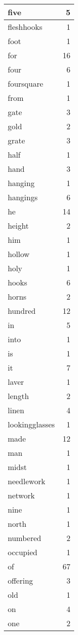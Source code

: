 \begin{center}
\begin{longtable}{l|r}
five & 5 \\ \hline
fleshhooks & 1 \\ \hline
foot & 1 \\ \hline
for & 16 \\ \hline
four & 6 \\ \hline
foursquare & 1 \\ \hline
from & 1 \\ \hline
gate & 3 \\ \hline
gold & 2 \\ \hline
grate & 3 \\ \hline
half & 1 \\ \hline
hand & 3 \\ \hline
hanging & 1 \\ \hline
hangings & 6 \\ \hline
he & 14 \\ \hline
height & 2 \\ \hline
him & 1 \\ \hline
hollow & 1 \\ \hline
holy & 1 \\ \hline
hooks & 6 \\ \hline
horns & 2 \\ \hline
hundred & 12 \\ \hline
in & 5 \\ \hline
into & 1 \\ \hline
is & 1 \\ \hline
it & 7 \\ \hline
laver & 1 \\ \hline
length & 2 \\ \hline
linen & 4 \\ \hline
lookingglasses & 1 \\ \hline
made & 12 \\ \hline
man & 1 \\ \hline
midst & 1 \\ \hline
needlework & 1 \\ \hline
network & 1 \\ \hline
nine & 1 \\ \hline
north & 1 \\ \hline
numbered & 2 \\ \hline
occupied & 1 \\ \hline
of & 67 \\ \hline
offering & 3 \\ \hline
old & 1 \\ \hline
on & 4 \\ \hline
one & 2 \\ \hline

\end{longtable}
\end{center}
